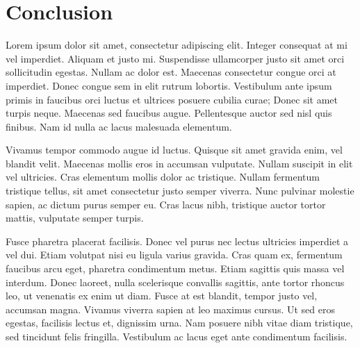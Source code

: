 \chapter{Conclusion}

Lorem ipsum dolor sit amet, consectetur adipiscing elit. Integer consequat at mi vel imperdiet. Aliquam et justo mi. Suspendisse ullamcorper justo sit amet orci sollicitudin egestas. Nullam ac dolor est. Maecenas consectetur congue orci at imperdiet. Donec congue sem in elit rutrum lobortis. Vestibulum ante ipsum primis in faucibus orci luctus et ultrices posuere cubilia curae; Donec sit amet turpis neque. Maecenas sed faucibus augue. Pellentesque auctor sed nisl quis finibus. Nam id nulla ac lacus malesuada elementum.

Vivamus tempor commodo augue id luctus. Quisque sit amet gravida enim, vel blandit velit. Maecenas mollis eros in accumsan vulputate. Nullam suscipit in elit vel ultricies. Cras elementum mollis dolor ac tristique. Nullam fermentum tristique tellus, sit amet consectetur justo semper viverra. Nunc pulvinar molestie sapien, ac dictum purus semper eu. Cras lacus nibh, tristique auctor tortor mattis, vulputate semper turpis.

Fusce pharetra placerat facilisis. Donec vel purus nec lectus ultricies imperdiet a vel dui. Etiam volutpat nisi eu ligula varius gravida. Cras quam ex, fermentum faucibus arcu eget, pharetra condimentum metus. Etiam sagittis quis massa vel interdum. Donec laoreet, nulla scelerisque convallis sagittis, ante tortor rhoncus leo, ut venenatis ex enim ut diam. Fusce at est blandit, tempor justo vel, accumsan magna. Vivamus viverra sapien at leo maximus cursus. Ut sed eros egestas, facilisis lectus et, dignissim urna. Nam posuere nibh vitae diam tristique, sed tincidunt felis fringilla. Vestibulum ac lacus eget ante condimentum facilisis.


\newpage
